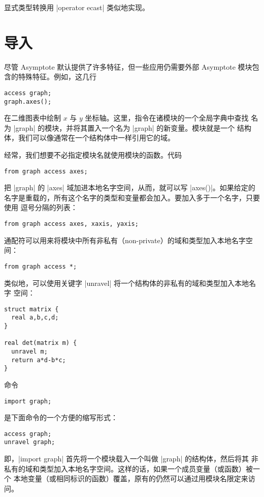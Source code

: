 \documentclass[nofonts,CJKnormalspaces]{ctexbook}[2009/05/20]
\newcommand*\prgname[1]{\textsf{#1}}
\begin{document}
{{{
显式类型转换用 |operator ecast| 类似地实现。



\section{导入}

尽管 \prgname{Asymptote} 默认提供了许多特征，但一些应用仍需要外部
\prgname{Asymptote} 模块包含的特殊特征。例如，这几行
\begin{lstlisting}
access graph;
graph.axes();
\end{lstlisting}
在二维图表中绘制 $x$ 与 $y$ 坐标轴。这里，指令在诸模块的一个全局字典中查找
名为 |graph| 的模块，并将其置入一个名为 |graph| 的新变量。模块就是一个
结构体，我们可以像通常在一个结构体中一样引用它的域。

经常，我们想要不必指定模块名就使用模块的函数。代码
\begin{lstlisting}
from graph access axes;
\end{lstlisting}
把 |graph| 的 |axes| 域加进本地名字空间，从而，就可以写 |axes()|。如果给定的
名字是重载的，所有这个名字的类型和变量都会加入。要加入多于一个名字，只要使用
逗号分隔的列表：
\begin{lstlisting}
from graph access axes, xaxis, yaxis;
\end{lstlisting}
通配符可以用来将模块中所有非私有（non-private）的域和类型加入本地名字空间：
\begin{lstlisting}
from graph access *;
\end{lstlisting}

类似地，可以使用关键字 |unravel| 将一个结构体的非私有的域和类型加入本地名字
空间：
\begin{lstlisting}
struct matrix {
  real a,b,c,d;
}

real det(matrix m) {
  unravel m;
  return a*d-b*c;
}
\end{lstlisting}

命令
\begin{lstlisting}
import graph;
\end{lstlisting}
是下面命令的一个方便的缩写形式：
\begin{lstlisting}
access graph;
unravel graph;
\end{lstlisting}

即，|import graph| 首先将一个模块载入一个叫做 |graph| 的结构体，然后将其
非私有的域和类型加入本地名字空间。这样的话，如果一个成员变量（或函数）被一个
本地变量（或相同标识的函数）覆盖，原有的仍然可以通过用模块名限定来访问。

}}}
\end{document}
